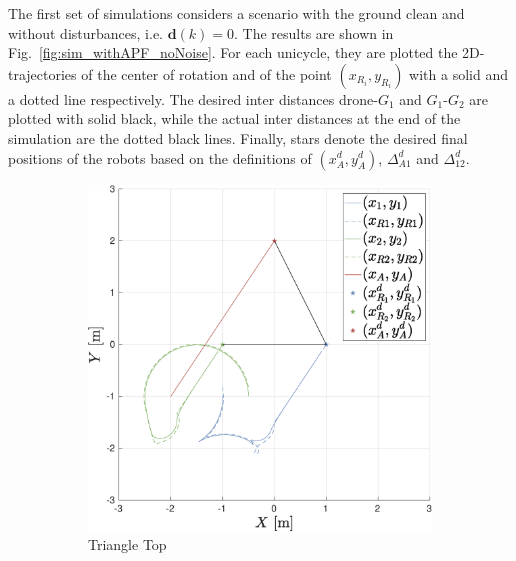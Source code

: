\documentclass{ifacconf}
\begin{document}
The first set of simulations considers a scenario with the ground clean 
and without disturbances, i.e. $\boldsymbol{d}(k) = 0$.
The results are shown in Fig.~\ref{fig:sim_withAPF_noNoise}.
For each unicycle, they are plotted the 2D-trajectories 
of the center of rotation and of the point $(x_{R_i}, y_{R_i})$ 
with a solid and a dotted line respectively.
The desired inter distances drone-$G_1$ and $G_1$-$G_2$ are plotted 
with solid black, while the actual inter distances at the end of the simulation 
are the dotted black lines.
Finally, stars denote the desired final positions of the robots 
based on the definitions of $(x^d_A, y^d_A)$, $ \Delta^d_{A1}$ and $\Delta^d_{12}$.
\begin{figure}
    \centering
    \begin{subfigure}[b]{0.32\columnwidth}
        \centering
        \includegraphics[width=\linewidth]{images/simulations/with_APF/not_noisy/1st_scenario_with_noNoise.eps}
         \caption{Triangle Top}
         \label{fig:sim_withAPF_noNoise_1}
    \end{subfigure}
    \begin{subfigure}[b]{0.32\columnwidth}
        \centering

\end{subfigure}
\end{figure}
\end{document}
